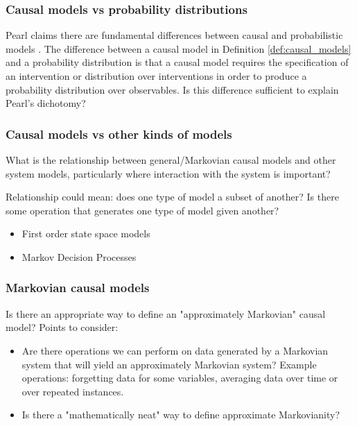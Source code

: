 \subsubsection{Causal models vs probability distributions}

\begin{question}
    Pearl claims there are fundamental differences between causal and probabilistic models \cite{pearl_causality:_2009}. The difference between a causal model in Definition \ref{def:causal_models} and a probability distribution is that a causal model requires the specification of an intervention or distribution over interventions in order to produce a probability distribution over observables. Is this difference sufficient to explain Pearl's dichotomy?
\end{question}

\subsubsection{Causal models vs other kinds of models}

\begin{question}
    What is the relationship between general/Markovian causal models and other system models, particularly where interaction with the system is important? 
    
    Relationship could mean: does one type of model a subset of another? Is there some operation that generates one type of model given another?
    \begin{itemize}
        \item First order state space models
        \item Markov Decision Processes
    \end{itemize}
\end{question}

\subsubsection{Markovian causal models}

\begin{question}
    Is there an appropriate way to define an "approximately Markovian" causal model?
    Points to consider:
    \begin{itemize}
        \item Are there operations we can perform on data generated by a Markovian system that will yield an approximately Markovian system? Example operations: forgetting data for some variables, averaging data over time or over repeated instances.
        \item Is there a "mathematically neat" way to define approximate Markovianity?
    \end{itemize}
\end{question}

